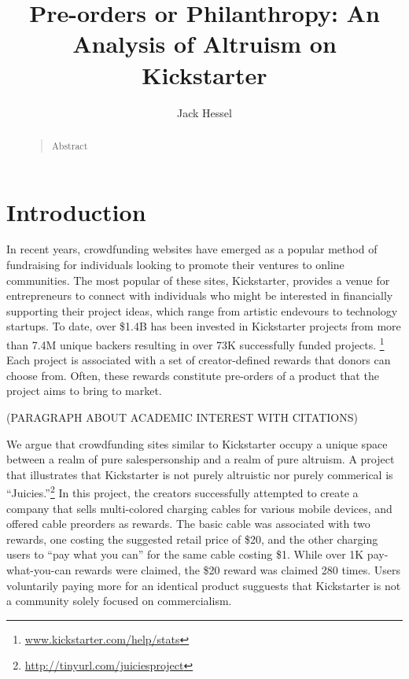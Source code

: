 \documentclass[letterpaper]{article}
\begin{document}
%
\title{Pre-orders or Philanthropy: An Analysis of Altruism on Kickstarter}
\author{Jack Hessel}
\maketitle
\begin{abstract}
\begin{quote}
Abstract
\end{quote}
\end{abstract}

\section{Introduction}

In recent years, crowdfunding websites have emerged as a popular method of fundraising for individuals looking to promote their ventures to online communities. The most popular of these sites, Kickstarter, provides a venue for entrepreneurs to connect with individuals who might be interested in financially supporting their project ideas, which range from artistic endevours to technology startups. To date, over \$1.4B has been invested in Kickstarter projects from more than 7.4M unique backers resulting in over 73K successfully funded projects. \footnote{ \url{www.kickstarter.com/help/stats}} Each project is associated with a set of creator-defined rewards that donors can choose from. Often, these rewards constitute pre-orders of a product that the project aims to bring to market.

(PARAGRAPH ABOUT ACADEMIC INTEREST WITH CITATIONS)

We argue that crowdfunding sites similar to Kickstarter occupy a unique space between a realm of pure salespersonship and a realm of pure altruism. A project that illustrates that Kickstarter is not purely altruistic nor purely commerical is ``Juicies.''\footnote{\url{http://tinyurl.com/juiciesproject}} In this project, the creators successfully attempted to create a company that sells multi-colored charging cables for various mobile devices, and offered cable preorders as rewards. The basic cable was associated with two rewards, one costing the suggested retail price of \$20, and the other charging users to ``pay what you can'' for the same cable costing \$1. While over 1K pay-what-you-can rewards were claimed, the \$20 reward was claimed 280 times. Users voluntarily paying more for an identical product sugguests that Kickstarter is not a community solely focused on commercialism.
\end{document}
